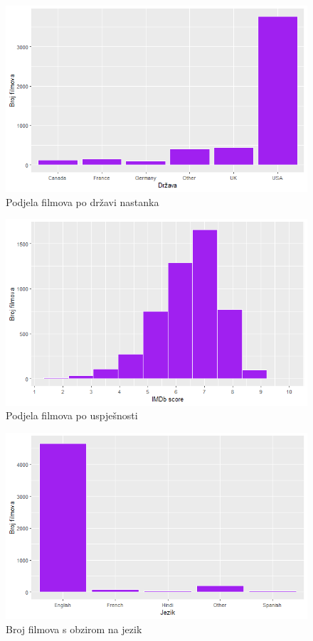 	 \begin{figure}[H]
	 	\centering
	 	\includegraphics[width=15cm]{../figures/lucija_jednostavni/drzava.png}
	 	\caption{Podjela filmova po državi nastanka}
	 	\label{drzava}
	 \end{figure}
	 
	 \begin{figure}[H]
		 \centering
		 \includegraphics[width=15cm]{../figures/lucija_jednostavni/imdb.png}
		 \caption{Podjela filmova po uspješnosti}
		 \label{imdb}
	 \end{figure}
	 
	 \begin{figure}[H]
		 \centering
		 \includegraphics[width=15cm]{../figures/lucija_jednostavni/jezik.png}
		 \caption{Broj filmova s obzirom na jezik}
		 \label{jezik}
	 \end{figure}
	 
	
	 
	 
	 
	 
	 
	 
	 
	 
	\eject